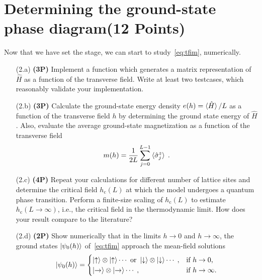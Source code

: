 \documentclass[a4paper, 12pt]{article}
\begin{document}
%
\section{Determining the ground-state phase diagram\textbf{(12 Points)}}
%
Now that we have set the stage, we can start to study~\cref{eq:tfim}, numerically.
%
\begin{itemize}
	\item[(2.a)] \textbf{(3P)}
	Implement a function which generates a matrix representation of $\hat H$ as a function of the transverse field.
	Write at least two testcases, which reasonably validate your implementation.
	\item[(2.b)] \textbf{(3P)}
	Calculate the ground-state energy density $e(h) = \braket{\hat H}/L$ as a function of the transverse field $h$ by determining the ground state energy of $\hat H$.
	Also, evaluate the average ground-state magnetization as a function of the transverse field
	\begin{equation}
		m(h) = \frac{1}{2L} \sum_{j=0}^{L-1} \braket{\hat \sigma^z_j} \;.
	\end{equation}
	\item[(2.c)] \textbf{(4P)}
	Repeat your calculations for different number of lattice sites and determine the critical field $h_\mathrm{c}(L)$ at which the model undergoes a quantum phase transition.
	Perform a finite-size scaling of $h_\mathrm{c}(L)$ to estimate $h_\mathrm{c}(L\rightarrow \infty)$, i.e., the critical field in the thermodynamic limit.
	How does your result compare to the literature?
	\item[(2.d)] \textbf{(2P)}
	Show numerically that in the limits $h\rightarrow 0$ and $h\rightarrow \infty$, the ground states $\ket{\psi_0(h)}$ of~\cref{eq:tfim} approach the mean-field solutions
	\begin{equation}
		\ket{\psi_0(h)}
		=
		\begin{cases}
			\ket{\uparrow}\otimes\ket{\uparrow} \cdots \text{ or } \ket{\downarrow}\otimes\ket{\downarrow} \cdots\;, &\text{if $h\rightarrow 0$,} \\
			\ket{\rightarrow}\otimes\ket{\rightarrow} \cdots\;, &\text{if $h\rightarrow \infty$.} \\
		\end{cases}
	\end{equation}
\end{itemize}
%
\batchmode  %
\end{document}
